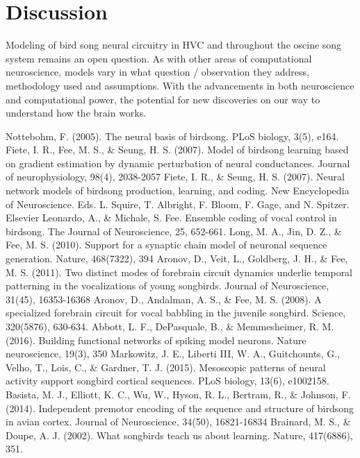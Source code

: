 \documentclass[draft,12pt,oneside]{CUNY_PhD}
\begin{document}
\chapter{Discussion}
Modeling of bird song neural circuitry in HVC and throughout the oscine song system remains an open question. As with other areas of computational neuroscience, models vary in what question / observation they address, methodology used and assumptions. With the advancements in both neuroscience and computational power, the potential for new discoveries on our way to understand how the brain works.
\backmatter
\begin{thebibliography}{22} 

Nottebohm, F. (2005). The neural basis of birdsong. PLoS biology, 3(5), e164.
Fiete, I. R., Fee, M. S., \& Seung, H. S. (2007). Model of birdsong learning based on gradient estimation by dynamic perturbation of neural conductances. Journal of neurophysiology, 98(4), 2038-2057
 Fiete, I. R., \& Seung, H. S. (2007). Neural network models of birdsong production, learning, and coding. New Encyclopedia of Neuroscience. Eds. L. Squire, T. Albright, F. Bloom, F. Gage, and N. Spitzer. Elsevier
 Leonardo, A., \& Michale, S. Fee. Ensemble coding of vocal control in birdsong. The Journal of Neuroscience, 25, 652-661.
 Long, M. A., Jin, D. Z., \& Fee, M. S. (2010). Support for a synaptic chain model of neuronal sequence generation. Nature, 468(7322), 394
 Aronov, D., Veit, L., Goldberg, J. H., \& Fee, M. S. (2011). Two distinct modes of forebrain circuit dynamics underlie temporal patterning in the vocalizations of young songbirds. Journal of Neuroscience, 31(45), 16353-16368
Aronov, D., Andalman, A. S., \& Fee, M. S. (2008). A specialized forebrain circuit for vocal babbling in the juvenile songbird. Science, 320(5876), 630-634.
Abbott, L. F., DePasquale, B., \& Memmesheimer, R. M. (2016). Building functional networks of spiking model neurons. Nature neuroscience, 19(3), 350
Markowitz, J. E., Liberti III, W. A., Guitchounts, G., Velho, T., Lois, C., \& Gardner, T. J. (2015). Mesoscopic patterns of neural activity support songbird cortical sequences. PLoS biology, 13(6), e1002158.
Basista, M. J., Elliott, K. C., Wu, W., Hyson, R. L., Bertram, R., \& Johnson, F. (2014). Independent premotor encoding of the sequence and structure of birdsong in avian cortex. Journal of Neuroscience, 34(50), 16821-16834
Brainard, M. S., \& Doupe, A. J. (2002). What songbirds teach us about learning. Nature, 417(6886), 351.

\end{thebibliography}
\end{document}
